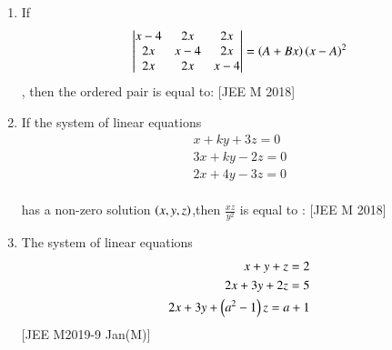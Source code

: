 \documentclass[journal,,12pt,onecolumn]{IEEEtran}
\theoremstyle{remark}
\begin{document}
\begin{enumerate}
\begin{enumerate}
\end{enumerate} 
\item If \begin{align} \begin{vmatrix}
x-4 & 2x  & 2x\\
2x & x-4 & 2x \\
 2x & 2x & x-4 
\end{vmatrix} =\left(A+Bx\right)\left(x-A\right)^2\end{align}, then the ordered pair  is equal to: 
\hfill{[JEE M 2018]}
\begin{enumerate}
\end{enumerate}
\item If the system of linear equations \\
\begin{align}x+ky+3z=0 \\
3x+ky-2z=0 \\
2x+4y-3z=0 \end{align}\\
has a non-zero solution $\left(x,y,z\right)$,then $\frac{xz}{y^2}$ is equal to :
\hfill{[JEE M 2018]}
\begin{enumerate}
\end{enumerate}
\item The system of linear equations \\
\begin{align}x+y+z=2 \\
2x+3y+2z=5 \\
2x+3y+\left(a^2-1\right)z=a+1 \end{align} 
\hfill{[JEE M2019-9 Jan(M)]}
\begin{enumerate}


\end{enumerate}
\end{enumerate}
\end{document}
